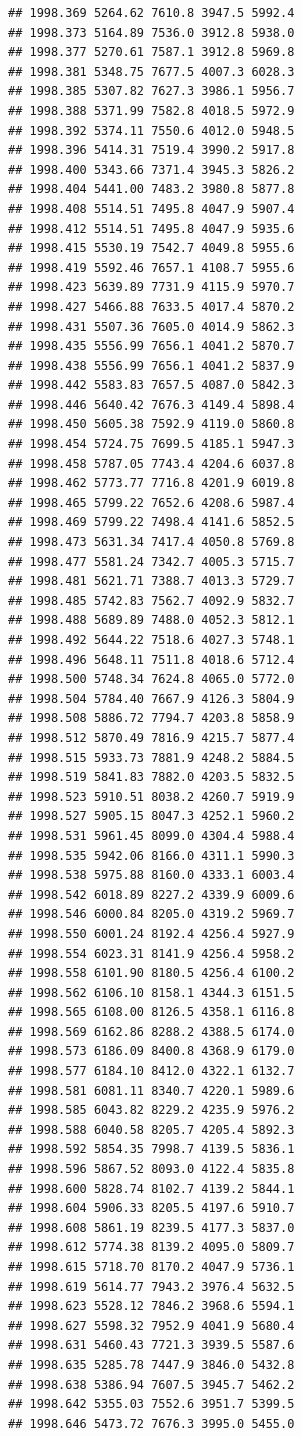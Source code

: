 \documentclass[
]{book}
\begin{document}
\begin{verbatim}
## 1998.369 5264.62 7610.8 3947.5 5992.4
## 1998.373 5164.89 7536.0 3912.8 5938.0
## 1998.377 5270.61 7587.1 3912.8 5969.8
## 1998.381 5348.75 7677.5 4007.3 6028.3
## 1998.385 5307.82 7627.3 3986.1 5956.7
## 1998.388 5371.99 7582.8 4018.5 5972.9
## 1998.392 5374.11 7550.6 4012.0 5948.5
## 1998.396 5414.31 7519.4 3990.2 5917.8
## 1998.400 5343.66 7371.4 3945.3 5826.2
## 1998.404 5441.00 7483.2 3980.8 5877.8
## 1998.408 5514.51 7495.8 4047.9 5907.4
## 1998.412 5514.51 7495.8 4047.9 5935.6
## 1998.415 5530.19 7542.7 4049.8 5955.6
## 1998.419 5592.46 7657.1 4108.7 5955.6
## 1998.423 5639.89 7731.9 4115.9 5970.7
## 1998.427 5466.88 7633.5 4017.4 5870.2
## 1998.431 5507.36 7605.0 4014.9 5862.3
## 1998.435 5556.99 7656.1 4041.2 5870.7
## 1998.438 5556.99 7656.1 4041.2 5837.9
## 1998.442 5583.83 7657.5 4087.0 5842.3
## 1998.446 5640.42 7676.3 4149.4 5898.4
## 1998.450 5605.38 7592.9 4119.0 5860.8
## 1998.454 5724.75 7699.5 4185.1 5947.3
## 1998.458 5787.05 7743.4 4204.6 6037.8
## 1998.462 5773.77 7716.8 4201.9 6019.8
## 1998.465 5799.22 7652.6 4208.6 5987.4
## 1998.469 5799.22 7498.4 4141.6 5852.5
## 1998.473 5631.34 7417.4 4050.8 5769.8
## 1998.477 5581.24 7342.7 4005.3 5715.7
## 1998.481 5621.71 7388.7 4013.3 5729.7
## 1998.485 5742.83 7562.7 4092.9 5832.7
## 1998.488 5689.89 7488.0 4052.3 5812.1
## 1998.492 5644.22 7518.6 4027.3 5748.1
## 1998.496 5648.11 7511.8 4018.6 5712.4
## 1998.500 5748.34 7624.8 4065.0 5772.0
## 1998.504 5784.40 7667.9 4126.3 5804.9
## 1998.508 5886.72 7794.7 4203.8 5858.9
## 1998.512 5870.49 7816.9 4215.7 5877.4
## 1998.515 5933.73 7881.9 4248.2 5884.5
## 1998.519 5841.83 7882.0 4203.5 5832.5
## 1998.523 5910.51 8038.2 4260.7 5919.9
## 1998.527 5905.15 8047.3 4252.1 5960.2
## 1998.531 5961.45 8099.0 4304.4 5988.4
## 1998.535 5942.06 8166.0 4311.1 5990.3
## 1998.538 5975.88 8160.0 4333.1 6003.4
## 1998.542 6018.89 8227.2 4339.9 6009.6
## 1998.546 6000.84 8205.0 4319.2 5969.7
## 1998.550 6001.24 8192.4 4256.4 5927.9
## 1998.554 6023.31 8141.9 4256.4 5958.2
## 1998.558 6101.90 8180.5 4256.4 6100.2
## 1998.562 6106.10 8158.1 4344.3 6151.5
## 1998.565 6108.00 8126.5 4358.1 6116.8
## 1998.569 6162.86 8288.2 4388.5 6174.0
## 1998.573 6186.09 8400.8 4368.9 6179.0
## 1998.577 6184.10 8412.0 4322.1 6132.7
## 1998.581 6081.11 8340.7 4220.1 5989.6
## 1998.585 6043.82 8229.2 4235.9 5976.2
## 1998.588 6040.58 8205.7 4205.4 5892.3
## 1998.592 5854.35 7998.7 4139.5 5836.1
## 1998.596 5867.52 8093.0 4122.4 5835.8
## 1998.600 5828.74 8102.7 4139.2 5844.1
## 1998.604 5906.33 8205.5 4197.6 5910.7
## 1998.608 5861.19 8239.5 4177.3 5837.0
## 1998.612 5774.38 8139.2 4095.0 5809.7
## 1998.615 5718.70 8170.2 4047.9 5736.1
## 1998.619 5614.77 7943.2 3976.4 5632.5
## 1998.623 5528.12 7846.2 3968.6 5594.1
## 1998.627 5598.32 7952.9 4041.9 5680.4
## 1998.631 5460.43 7721.3 3939.5 5587.6
## 1998.635 5285.78 7447.9 3846.0 5432.8
## 1998.638 5386.94 7607.5 3945.7 5462.2
## 1998.642 5355.03 7552.6 3951.7 5399.5
## 1998.646 5473.72 7676.3 3995.0 5455.0
\end{verbatim}
\end{document}
